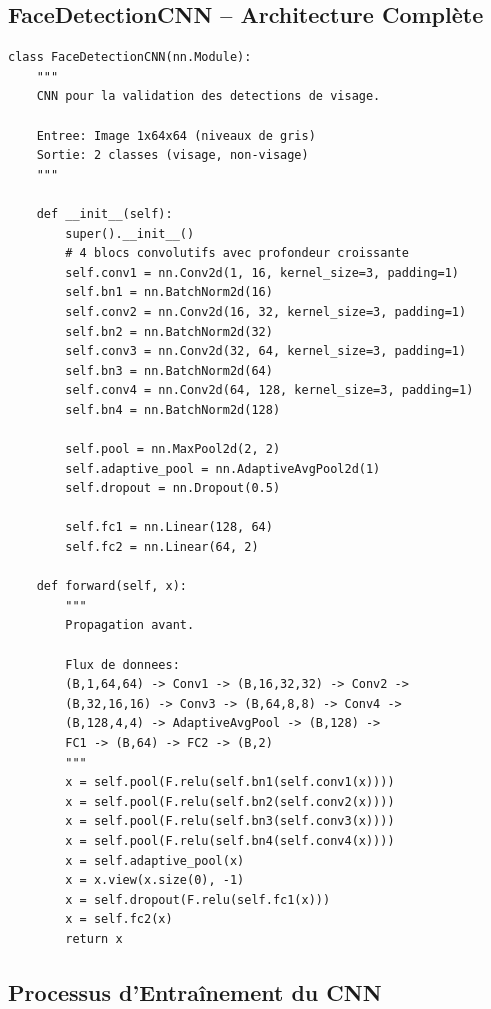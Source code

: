 \documentclass[12pt,a4paper,twoside]{report}
\begin{document}
\subsection{FaceDetectionCNN -- Architecture Complète}

\begin{lstlisting}[style=pythonstyle, caption={Architecture du FaceDetectionCNN.}, label={lst:face_cnn}]
class FaceDetectionCNN(nn.Module):
    """
    CNN pour la validation des detections de visage.
    
    Entree: Image 1x64x64 (niveaux de gris)
    Sortie: 2 classes (visage, non-visage)
    """
    
    def __init__(self):
        super().__init__()
        # 4 blocs convolutifs avec profondeur croissante
        self.conv1 = nn.Conv2d(1, 16, kernel_size=3, padding=1)
        self.bn1 = nn.BatchNorm2d(16)
        self.conv2 = nn.Conv2d(16, 32, kernel_size=3, padding=1)
        self.bn2 = nn.BatchNorm2d(32)
        self.conv3 = nn.Conv2d(32, 64, kernel_size=3, padding=1)
        self.bn3 = nn.BatchNorm2d(64)
        self.conv4 = nn.Conv2d(64, 128, kernel_size=3, padding=1)
        self.bn4 = nn.BatchNorm2d(128)
        
        self.pool = nn.MaxPool2d(2, 2)
        self.adaptive_pool = nn.AdaptiveAvgPool2d(1)
        self.dropout = nn.Dropout(0.5)
        
        self.fc1 = nn.Linear(128, 64)
        self.fc2 = nn.Linear(64, 2)
    
    def forward(self, x):
        """
        Propagation avant.
        
        Flux de donnees:
        (B,1,64,64) -> Conv1 -> (B,16,32,32) -> Conv2 -> 
        (B,32,16,16) -> Conv3 -> (B,64,8,8) -> Conv4 -> 
        (B,128,4,4) -> AdaptiveAvgPool -> (B,128) -> 
        FC1 -> (B,64) -> FC2 -> (B,2)
        """
        x = self.pool(F.relu(self.bn1(self.conv1(x))))
        x = self.pool(F.relu(self.bn2(self.conv2(x))))
        x = self.pool(F.relu(self.bn3(self.conv3(x))))
        x = self.pool(F.relu(self.bn4(self.conv4(x))))
        x = self.adaptive_pool(x)
        x = x.view(x.size(0), -1)
        x = self.dropout(F.relu(self.fc1(x)))
        x = self.fc2(x)
        return x
\end{lstlisting}

\subsection{Processus d'Entraînement du CNN}
\end{document}
